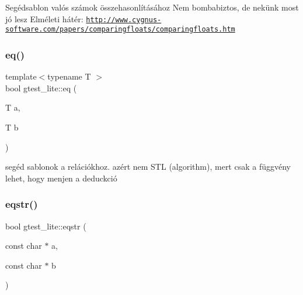 Segédsablon valós számok összehasonlításához Nem bombabiztos, de nekünk most jó lesz Elméleti hátér\+: \href{http://www.cygnus-software.com/papers/comparingfloats/comparingfloats.htm}{\tt http\+://www.\+cygnus-\/software.\+com/papers/comparingfloats/comparingfloats.\+htm} \mbox{\label{namespacegtest__lite_aa7762f23094d59c699ec402e1a37640c}} 
\subsubsection{\texorpdfstring{eq()}{eq()}}
{\footnotesize\ttfamily template$<$typename T $>$ \\
bool gtest\+\_\+lite\+::eq (\begin{DoxyParamCaption}\item[{T}]{a,  }\item[{T}]{b }\end{DoxyParamCaption})}

segéd sablonok a relációkhoz. azért nem S\+TL (algorithm), mert csak a függvény lehet, hogy menjen a deduckció \mbox{\label{namespacegtest__lite_a34055f353dabbe4ed9063f1d36af6022}} 
\subsubsection{\texorpdfstring{eqstr()}{eqstr()}}
{\footnotesize\ttfamily bool gtest\+\_\+lite\+::eqstr (\begin{DoxyParamCaption}\item[{const char $\ast$}]{a,  }\item[{const char $\ast$}]{b }\end{DoxyParamCaption})\hspace{0.3cm}{\ttfamily [inline]}}

\mbox{\label{namespacegtest__lite_ab358c162e1cedfc39abf5959417ffc1e}} 
